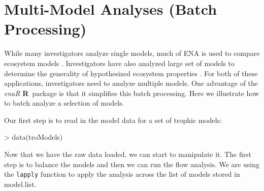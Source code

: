 \documentclass[article]{jss}
\newcommand{\R}{\textbf{R}}
\begin{document}
\section{Multi-Model Analyses (Batch Processing)}

While many investigators analyze single models, much of ENA is used to
compare ecosystem models \cite[e.g.,][]{baird91, baird95, christian03,
  whipple07}.  Investigators have also analyzed large set of models to
determine the generality of hypothesized ecosystem properties
\citep[e.g.,][]{christensen95, borrett10_hmg, salas11_did}.  For both
of these applications, investigators need to analyze multiple models.
One advantage of the \textit{enaR} \R\ package is that it simplifies this
batch processing.  Here we illustrate how to batch analyze a
selection of models.

Our first step is to read in the model data for a set of trophic
models:

\begin{Schunk}
\begin{Sinput}
> data(troModels)
\end{Sinput}
\end{Schunk}


Now that we have the raw data loaded, we can start to manipulate
it.  The first step is to balance the models and then we can run the
flow analysis.  We are using the \texttt{lapply} function to apply the
analysis across the list of models stored in model.list.

\end{document}
